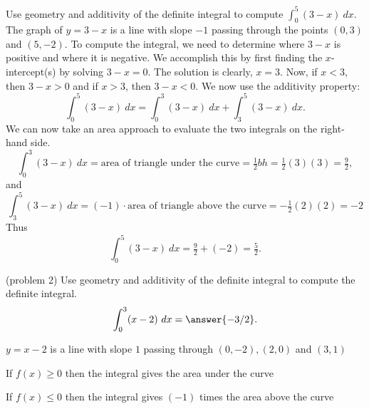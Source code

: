 \documentclass[handout]{ximera}
\begin{document}
\begin{example}[example 2]
Use geometry and additivity of the definite integral to compute  
$\displaystyle{\int_0^5  (3-x)  \ dx}$.
The graph of $y = 3-x$ is a line with slope $-1$ passing through the points $(0,3)$ and $(5,-2)$. To compute the integral,
we need to determine where $3-x$ is positive and where it is negative. We accomplish this by first finding the $x$-intercept(s)
by solving $3-x = 0$.  The solution is clearly, $x = 3$.  Now, if $x < 3$, then $3 - x >0$ and if
$x >3$, then $3-x <0$.
We now use the additivity property:
\[\int_0^5 (3-x) \ dx = \int_0^3 (3-x) \ dx  + \int_3^5 (3-x) \ dx.\]
We can now take an area approach to evaluate the two integrals on the right-hand side.
\[\int_0^3 (3-x) \ dx = \text{area of triangle under the curve} = \tfrac12bh = \tfrac12(3)(3) = \tfrac92,\]
and
\[\int_3^5 (3-x) \ dx = (-1)\cdot\text{area of triangle above the curve} = -\tfrac12(2)(2) = -2\]
Thus
\[\int_0^5 (3-x) \ dx = \tfrac92  + (-2) = \tfrac52.\]


\begin{image}
\end{image}

\end{example}


\begin{problem}(problem 2)
Use geometry and additivity of the definite integral to compute the definite integral.  
\[\int_0^3  (x-2)  \ dx= \answer{-3/2}.\]
\begin{hint}
$y=x-2$ is a line with slope $1$ passing through $(0,-2), (2,0)$ and $(3,1)$
\end{hint}
\begin{hint}
If $f(x) \geq 0$ then the integral gives the area under the curve
\end{hint}
\begin{hint}
If $f(x) \leq 0$ then the integral gives $(-1)$ times the area above the curve
\end{hint}

\end{problem}
\end{document}

